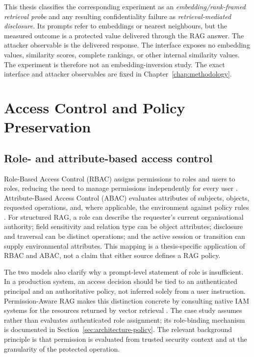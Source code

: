 This thesis classifies the corresponding experiment as an \emph{embedding/rank-framed retrieval probe} and any resulting confidentiality failure as \emph{retrieval-mediated disclosure}. Its prompts refer to embeddings or nearest neighbours, but the measured outcome is a protected value delivered through the RAG answer. The attacker observable is the delivered response. The interface exposes no embedding values, similarity scores, complete rankings, or other internal similarity values. The experiment is therefore not an embedding-inversion study. The exact interface and attacker observables are fixed in Chapter~\ref{chap:methodology}.

\section{Access Control and Policy Preservation}
\label{sec:background-policy-continuity}

\subsection{Role- and attribute-based access control}

Role-Based Access Control (RBAC) assigns permissions to roles and users to roles, reducing the need to manage permissions independently for every user \citep{sandhu1996rbac}. Attribute-Based Access Control (ABAC) evaluates attributes of subjects, objects, requested operations, and, where applicable, the environment against policy rules \citep{hu2014abac}. For structured RAG, a role can describe the requester's current organisational authority; field sensitivity and relation type can be object attributes; disclosure and traversal can be distinct operations; and the active session or transition can supply environmental attributes. This mapping is a thesis-specific application of RBAC and ABAC, not a claim that either source defines a RAG policy.

The two models also clarify why a prompt-level statement of role is insufficient. In a production system, an access decision should be tied to an authenticated principal and an authoritative policy, not inferred solely from a user instruction. Permission-Aware RAG makes this distinction concrete by consulting native IAM systems for the resources returned by vector retrieval \citep{jeong2025permissionrag}. The case study assumes rather than evaluates authenticated role assignment; its role-binding mechanism is documented in Section~\ref{sec:architecture-policy}. The relevant background principle is that permission is evaluated from trusted security context and at the granularity of the protected operation.

